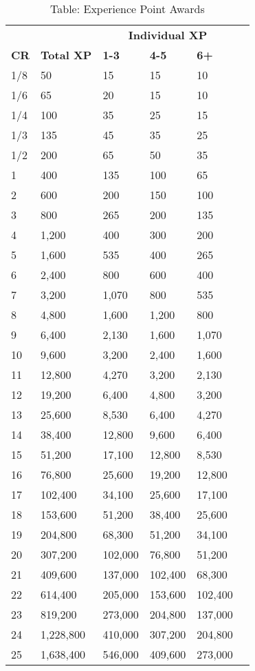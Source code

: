 \begin{table}[]
\sffamily
\caption{Table: Experience Point Awards}
\begin{tabular}{llllll}
            &                   & \multicolumn{3}{c}{\textbf{Individual XP}}\\
\textbf{CR} & \textbf{Total XP} & \textbf{1-3} & \textbf{4-5} & \textbf{6+}\\
1/8 & 50 & 15 & 15 & 10 \\
 1/6 & 65 & 20 & 15 & 10 \\
 1/4 & 100 & 35 & 25 & 15 \\
 1/3 & 135 & 45 & 35 & 25 \\
 1/2 & 200 & 65 & 50 & 35 \\
 1 & 400 & 135 & 100 & 65 \\
 2 & 600 & 200 & 150 & 100 \\
 3 & 800 & 265 & 200 & 135 \\
 4 & 1,200 & 400 & 300 & 200 \\
 5 & 1,600 & 535 & 400 & 265 \\
 6 & 2,400 & 800 & 600 & 400 \\
 7 & 3,200 & 1,070 & 800 & 535 \\
 8 & 4,800 & 1,600 & 1,200 & 800 \\
 9 & 6,400 & 2,130 & 1,600 & 1,070 \\
 10 & 9,600 & 3,200 & 2,400 & 1,600 \\
 11 & 12,800 & 4,270 & 3,200 & 2,130 \\
 12 & 19,200 & 6,400 & 4,800 & 3,200 \\
 13 & 25,600 & 8,530 & 6,400 & 4,270 \\
 14 & 38,400 & 12,800 & 9,600 & 6,400 \\
 15 & 51,200 & 17,100 & 12,800 & 8,530 \\
 16 & 76,800 & 25,600 & 19,200 & 12,800 \\
 17 & 102,400 & 34,100 & 25,600 & 17,100 \\
 18 & 153,600 & 51,200 & 38,400 & 25,600 \\
 19 & 204,800 & 68,300 & 51,200 & 34,100 \\
 20 & 307,200 & 102,000 & 76,800 & 51,200 \\
 21 & 409,600 & 137,000 & 102,400 & 68,300 \\
 22 & 614,400 & 205,000 & 153,600 & 102,400 \\
 23 & 819,200 & 273,000 & 204,800 & 137,000 \\
 24 & 1,228,800 & 410,000 & 307,200 & 204,800 \\
 25 & 1,638,400 & 546,000 & 409,600 & 273,000\\
\end{tabular}
\end{table}


